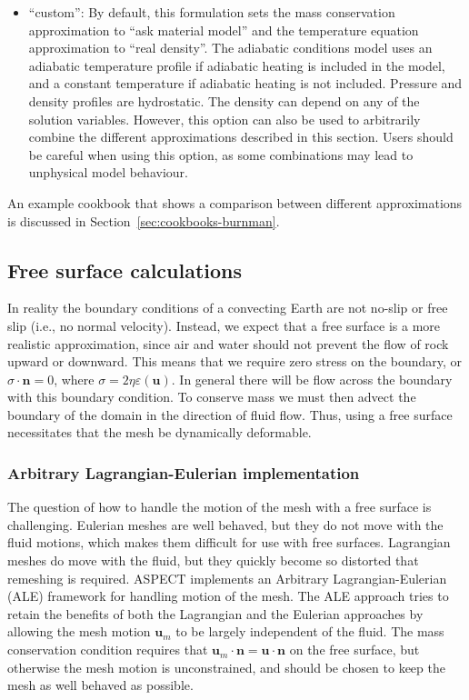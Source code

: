 \documentclass{article}
\newcommand{\aspect}{\textsc{ASPECT}}
\begin{document}
\begin{itemize}
\item
``custom'': By default, this formulation sets the mass conservation approximation 
to ``ask material model'' and the temperature equation approximation to ``real density''.
The adiabatic conditions model uses an adiabatic temperature profile if adiabatic heating
is included in the model, and a constant temperature if adiabatic heating is not included.
Pressure and density profiles are hydrostatic. The density can depend on any of the solution variables.
However, this option can also be used to arbitrarily combine the different approximations 
described in this section. Users should be careful when using this option, as some combinations
may lead to unphysical model behaviour. 
\end{itemize}

An example cookbook that shows a comparison between different approximations is discussed in Section~\ref{sec:cookbooks-burnman}.

\subsection{Free surface calculations}
\label{sec:freesurface}

In reality the boundary conditions of a convecting Earth are not no-slip or 
free slip (i.e., no normal velocity).  Instead, we expect that a free surface
is a more realistic approximation, since air and water should not prevent the
flow of rock upward or downward.  This means that we require zero stress on the 
boundary, or $\sigma \cdot \textbf{n} = 0$, where $\sigma = 2 \eta \varepsilon (\textbf{u})$. 
In general there will be flow across the boundary with this boundary condition.  
To conserve mass we must then advect the boundary of the domain in the direction 
of fluid flow.  Thus, using a free surface necessitates that the mesh be dynamically deformable.  

\subsubsection{Arbitrary Lagrangian-Eulerian implementation}

The question of how to handle the motion of the mesh with a free surface is
challenging.  Eulerian meshes are well behaved, but they do not move with the 
fluid motions, which makes them difficult for use with free surfaces. 
Lagrangian meshes do move with the fluid, but they quickly become so 
distorted that remeshing is required. \aspect{} implements an Arbitrary 
Lagrangian-Eulerian (ALE) framework for handling motion of the mesh.  The ALE 
approach tries to retain the benefits of both the Lagrangian and the Eulerian
approaches by allowing the mesh motion $\textbf{u}_m$ to be largely independent of 
the fluid. The mass conservation condition requires that 
$\textbf{u}_m \cdot \textbf{n} = \textbf{u} \cdot \textbf{n}$ on the free 
surface, but otherwise the mesh motion is unconstrained, and should be chosen
to keep the mesh as well behaved as possible.
\end{document}
